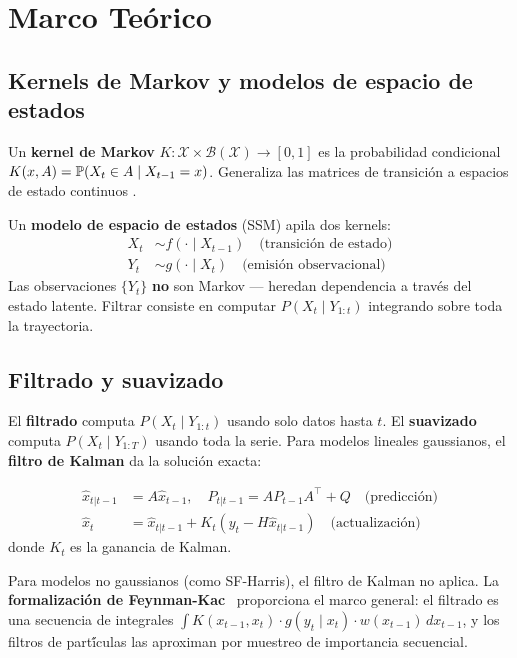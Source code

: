 
\chapter{Marco Te\'{o}rico}
\label{ch:marco-teorico}

\section{Kernels de Markov y modelos de espacio de estados}

Un \textbf{kernel de Markov} $K: \mathcal{X} \times \mathcal{B}(\mathcal{X}) \to [0,1]$ es la probabilidad
condicional $K(x, A) = \mathbb{P}(X_t \in A \mid X_{t-1} = x)$. Generaliza las matrices de
transici\'{o}n a espacios de estado continuos \citep{chopin2020}.

Un \textbf{modelo de espacio de estados} (SSM) apila dos kernels:
\begin{align}
    X_t &\sim f(\cdot \mid X_{t-1}) \quad \text{(transici\'{o}n de estado)} \\
    Y_t &\sim g(\cdot \mid X_t) \quad \text{(emisi\'{o}n observacional)}
\end{align}
Las observaciones $\{Y_t\}$ \textbf{no} son Markov --- heredan dependencia a trav\'{e}s del
estado latente. Filtrar consiste en computar $P(X_t \mid Y_{1:t})$ integrando sobre toda
la trayectoria.

\section{Filtrado y suavizado}

El \textbf{filtrado} computa $P(X_t \mid Y_{1:t})$ usando solo datos hasta $t$.
El \textbf{suavizado} computa $P(X_t \mid Y_{1:T})$ usando toda la serie.
Para modelos lineales gaussianos, el \textbf{filtro de Kalman} da la soluci\'{o}n exacta:

\begin{align}
    \hat{x}_{t|t-1} &= A\hat{x}_{t-1}, \quad P_{t|t-1} = AP_{t-1}A^\top + Q \quad \text{(predicci\'{o}n)} \\
    \hat{x}_t &= \hat{x}_{t|t-1} + K_t(y_t - H\hat{x}_{t|t-1}) \quad \text{(actualizaci\'{o}n)}
\end{align}
donde $K_t$ es la ganancia de Kalman.

Para modelos no gaussianos (como SF-Harris), el filtro de Kalman no aplica.
La \textbf{formalizaci\'{o}n de Feynman-Kac}~\citep{chopin2020} proporciona el marco general:
el filtrado es una secuencia de integrales
$\int K(x_{t-1}, x_t) \cdot g(y_t \mid x_t) \cdot w(x_{t-1}) \, dx_{t-1}$,
y los filtros de part\'{\'i}culas las aproximan por muestreo de importancia secuencial.

